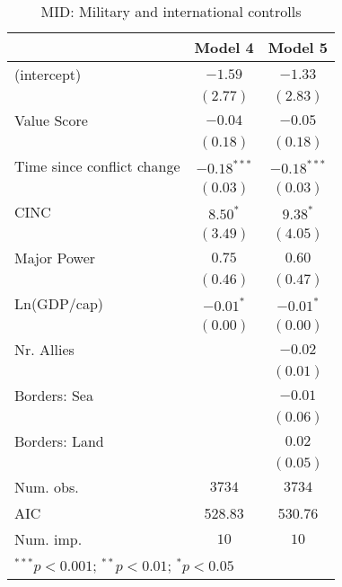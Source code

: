 
\begin{table}
\begin{center}
\begin{tabular}{l c c}
\toprule
 & Model 4 & Model 5 \\
\midrule
(intercept)                & $-1.59$       & $-1.33$       \\
                           & $(2.77)$      & $(2.83)$      \\
Value Score                & $-0.04$       & $-0.05$       \\
                           & $(0.18)$      & $(0.18)$      \\
Time since conflict change & $-0.18^{***}$ & $-0.18^{***}$ \\
                           & $(0.03)$      & $(0.03)$      \\
CINC                       & $8.50^{*}$    & $9.38^{*}$    \\
                           & $(3.49)$      & $(4.05)$      \\
Major Power                & $0.75$        & $0.60$        \\
                           & $(0.46)$      & $(0.47)$      \\
Ln(GDP/cap)                & $-0.01^{*}$   & $-0.01^{*}$   \\
                           & $(0.00)$      & $(0.00)$      \\
Nr. Allies                 &               & $-0.02$       \\
                           &               & $(0.01)$      \\
Borders: Sea               &               & $-0.01$       \\
                           &               & $(0.06)$      \\
Borders: Land              &               & $0.02$        \\
                           &               & $(0.05)$      \\
\midrule
Num. obs.                  & $3734$        & $3734$        \\
AIC                        & 528.83        & 530.76        \\
Num. imp.                  & $10$          & $10$          \\
\bottomrule
\multicolumn{3}{l}{\scriptsize{$^{***}p<0.001$; $^{**}p<0.01$; $^{*}p<0.05$}}
\end{tabular}
\caption{MID: Military and international controlls}
\label{MID_2}
\end{center}
\end{table}
